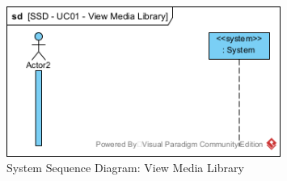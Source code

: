\begin{figure}[H]
    \centering
    \includegraphics[width=0.8\textwidth]{images/SSD-UC01-ViewMediaLibrary.png}
    \centering
    \caption{System Sequence Diagram: View Media Library}
\end{figure}